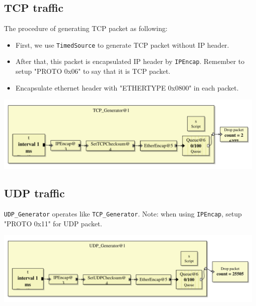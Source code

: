 \documentclass[a4paper]{article}
\begin{document}
  \subsection{TCP traffic}
  The procedure of generating TCP packet as following:
  \begin{itemize}
  	\item First, we use \texttt{TimedSource} to generate TCP packet without IP header.
  	\item After that, this packet is encapsulated IP header by \texttt{IPEncap}. Remember to setup "PROTO 0x06" to say that it is TCP packet.
  	\item Encapsulate ethernet header with "ETHERTYPE 0x0800" in each packet.
  \end{itemize}
  \begin{center}
	  \includegraphics[scale=0.55]{TCP_Source.pdf}
	  \label{fig:tcpsource}
  \end{center}
  \subsection{UDP traffic}
    \texttt{UDP\_Generator} operates like \texttt{TCP\_Generator}. Note: when using \texttt{IPEncap}, setup "PROTO 0x11" for UDP packet.
    \begin{center}
	  \includegraphics[scale=0.55]{UDP_Source.pdf}
	  \label{fig:udpsource}
  \end{center}
\end{document}

